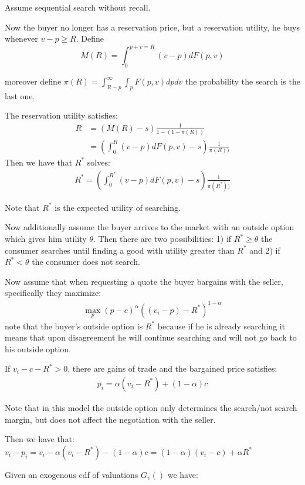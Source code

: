 \documentclass[12pt]{article}
\theoremstyle{plain}
\theoremstyle{plain}
\begin{document}
Assume sequential search without recall. 

Now the buyer no longer has a reservation price, but a reservation utility, he buys whenever $v-p\geq R$. 
Define
$$M(R) = \int_0^{p+v=R} (v-p)dF(p,v)$$ 

moreover define $\pi(R) = \int_{R-p}^\infty \int_p F(p,v)dpdv$ the probability the search is the last one. 

The reservation utility satisfies: 
\begin{align*}
        R &= (M(R)-s)\frac{1}{1-(1-\pi(R))} \\
        &= \left( \int_0^R (v-p)dF(p,v)-s\right)\frac{1}{\pi(R))} 
\end{align*}
Then we have that $R^*$ solves: 
\begin{align}\label{eq:reservation_utility}
        R^* = \left( \int_0^{R^*} (v-p)dF(p,v)-s\right)\frac{1}{\pi(R^*))} 
\end{align}


Note that $R^*$ is the expected utility of searching. 

Now additionally assume the buyer arrives to the market with an outside option which gives him utility $\theta$. Then there are two possibilities: 1) if $ R^*\geq \theta $ the consumer searches until finding a good with utility greater than  $R^*$ and 2) if $R^*<\theta$ the consumer does not search.

Now assume that when requesting a quote the buyer bargains with the seller, specifically they maximize: 
\begin{align*}
    \max_p (p-c)^\alpha ((v_i-p) - R^*)^{1-\alpha}
\end{align*}
note that the buyer's outside option is $R^*$ because if he is already searching it means that upon disagreement he will continue searching and will not go back to his outside option. 

If $v_i - c- R^*> 0$, there are gains of trade and the bargained price satisfies: 
\begin{align}\label{eq:bargained_prices}
    p_i=\alpha (v_i - R^*)+ (1-\alpha)c 
\end{align}


Note that in this model the outside option only determines the search/not search margin, but does not affect the negotiation with the seller. 

Then we have that: 
$v_i - p_i = v_i - \alpha (v_i - R^*)- (1-\alpha)c  = (1-\alpha)(v_i -c) +\alpha R^*$

Given an exogenous cdf of valuations $G_v()$ we have: 
\end{document}
